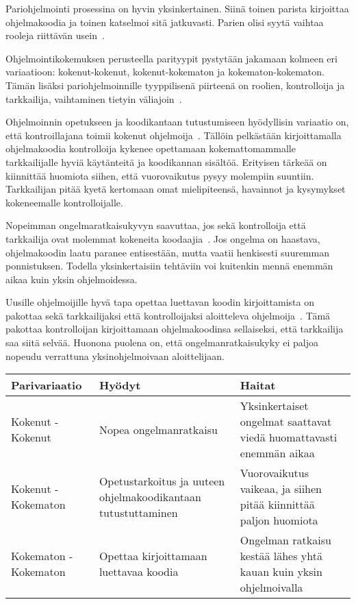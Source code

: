 \documentclass[finnish]{tktltiki2}
\theoremstyle{definition}
\theoremstyle{remark}
\begin{document}
Pariohjelmointi prosessina on hyvin yksinkertainen. Siinä toinen parista kirjoittaa ohjelmakoodia ja toinen katselmoi sitä jatkuvasti. Parien olisi syytä vaihtaa rooleja riittävän usein~\cite{beck00extreme}. 

Ohjelmointikokemuksen perusteella parityypit pystytään jakamaan kolmeen eri variaatioon: kokenut-kokenut, kokenut-kokematon ja kokematon-kokematon. Tämän lisäksi pariohjelmoinnille tyyppilisenä piirteenä on roolien, kontrolloija ja tarkkailija, vaihtaminen tietyin väliajoin~\cite{williams02support}.

Ohjelmoinnin opetukseen ja koodikantaan tutustumiseen hyödyllisin variaatio on, että kontroillajana toimii kokenut ohjelmoija~\cite{chong2007social}. Tällöin pelkästään kirjoittamalla ohjelmakoodia kontrolloija kykenee opettamaan kokemattomammalle tarkkailijalle hyviä käytänteitä ja koodikannan sisältöä. Erityisen tärkeää on kiinnittää huomiota siihen, että vuorovaikutus pysyy molempiin suuntiin. Tarkkailijan pitää kyetä kertomaan omat mielipiteensä, havainnot ja kysymykset kokeneemalle kontrolloijalle.

Nopeimman ongelmaratkaisukyvyn saavuttaa, jos sekä kontrolloija että tarkkailija ovat molemmat kokeneita koodaajia~\cite{voas2001faster}. Jos ongelma on haastava, ohjelmakoodin laatu paranee entisestään,  mutta vaatii henkisesti suuremman ponnistuksen. Todella yksinkertaisiin tehtäviin voi kuitenkin mennä enemmän aikaa kuin yksin ohjelmoidessa.

Uusille ohjelmoijille hyvä tapa opettaa luettavan koodin kirjoittamista on pakottaa sekä tarkkailijaksi että kontrolloijaksi aloitteleva ohjelmoija~\cite{chong2007social}. Tämä pakottaa kontrolloijan kirjoittamaan ohjelmakoodinsa sellaiseksi, että tarkkailija saa siitä selvää. Huonona puolena on, että ongelmanratkaisukyky ei paljoa nopeudu verrattuna yksinohjelmoivaan aloittelijaan.

\begin{center}
    \begin{tabular}{ | p{} | p{5cm} | p{4cm} | }
    \hline
   	Parivariaatio & Hyödyt & Haitat \\ \hline
    	Kokenut - Kokenut & Nopea ongelmanratkaisu & Yksinkertaiset ongelmat saattavat viedä huomattavasti enemmän aikaa\\ \hline
	Kokenut - Kokematon & Opetustarkoitus ja uuteen ohjelmakoodikantaan tutustuttaminen & Vuorovaikutus vaikeaa, ja siihen pitää kiinnittää paljon huomiota\\ \hline
	Kokematon - Kokematon & Opettaa kirjoittamaan luettavaa koodia & Ongelman ratkaisu kestää lähes yhtä kauan kuin yksin ohjelmoivalla \\ \hline
    \end{tabular}
\end{center}
\end{document}
